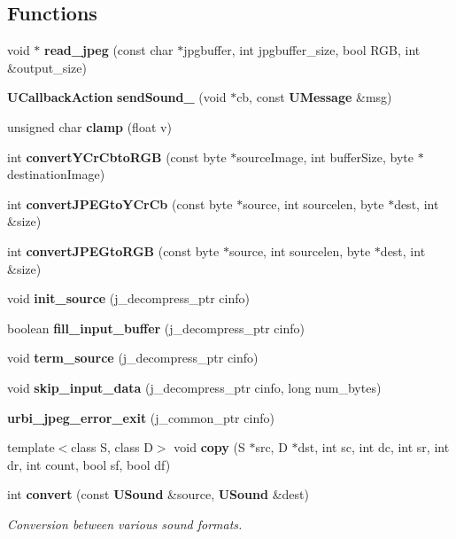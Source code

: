 \subsection*{Functions}
\begin{CompactItemize}
\item 
void $\ast$ {\bf read\_\-jpeg} (const char $\ast$jpgbuffer, int jpgbuffer\_\-size, bool RGB, int \&output\_\-size)
\item 
{\bf UCallback\-Action} {\bf send\-Sound\_\-} (void $\ast$cb, const {\bf UMessage} \&msg)\label{uabstractclient_8cpp_a7}

\item 
unsigned char {\bf clamp} (float v)\label{uabstractclient_8cpp_a8}

\item 
int {\bf convert\-YCr\-Cbto\-RGB} (const byte $\ast$source\-Image, int buffer\-Size, byte $\ast$destination\-Image)\label{uabstractclient_8cpp_a9}

\item 
int {\bf convert\-JPEGto\-YCr\-Cb} (const byte $\ast$source, int sourcelen, byte $\ast$dest, int \&size)\label{uabstractclient_8cpp_a10}

\item 
int {\bf convert\-JPEGto\-RGB} (const byte $\ast$source, int sourcelen, byte $\ast$dest, int \&size)\label{uabstractclient_8cpp_a11}

\item 
void {\bf init\_\-source} (j\_\-decompress\_\-ptr cinfo)\label{uabstractclient_8cpp_a12}

\item 
boolean {\bf fill\_\-input\_\-buffer} (j\_\-decompress\_\-ptr cinfo)\label{uabstractclient_8cpp_a13}

\item 
void {\bf term\_\-source} (j\_\-decompress\_\-ptr cinfo)\label{uabstractclient_8cpp_a14}

\item 
void {\bf skip\_\-input\_\-data} (j\_\-decompress\_\-ptr cinfo, long num\_\-bytes)\label{uabstractclient_8cpp_a15}

\item 
{\bf urbi\_\-jpeg\_\-error\_\-exit} (j\_\-common\_\-ptr cinfo)\label{uabstractclient_8cpp_a16}

\item 
template$<$class S, class D$>$ void {\bf copy} (S $\ast$src, D $\ast$dst, int sc, int dc, int sr, int dr, int count, bool sf, bool df)\label{uabstractclient_8cpp_a17}

\item 
int {\bf convert} (const {\bf USound} \&source, {\bf USound} \&dest)
\begin{CompactList}\small\item\em Conversion between various sound formats. \item\end{CompactList}\end{CompactItemize}
